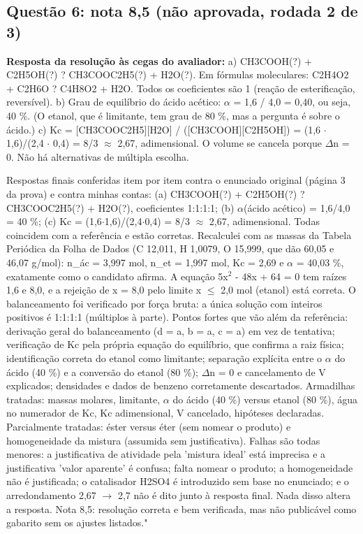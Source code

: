 \documentclass{article}%
\begin{document}
\subsection*{Questão 6: nota 8,5 (não aprovada, rodada 2 de 3)}%
\textbf{Resposta da resolução às cegas do avaliador:} a) CH3COOH(?) + C2H5OH(?) ? CH3COOC2H5(?) + H2O(?). Em fórmulas moleculares: C2H4O2 + C2H6O ? C4H8O2 + H2O. Todos os coeficientes são 1 (reação de esterificação, reversível).\newline%
\newline%
b) Grau de equilíbrio do ácido acético: $\alpha$ = 1,6 / 4,0 = 0,40, ou seja, 40 \%. (O etanol, que é limitante, tem grau de 80 \%, mas a pergunta é sobre o ácido.)\newline%
\newline%
c) Kc = {[}CH3COOC2H5{]}{[}H2O{]} / ({[}CH3COOH{]}{[}C2H5OH{]}) = (1,6 $\cdot$ 1,6)/(2,4 $\cdot$ 0,4) = 8/3 $\approx$ 2,67, adimensional. O volume se cancela porque $\Delta$n = 0.\newline%
\newline%
Não há alternativas de múltipla escolha.\par %
Respostas finais conferidas item por item contra o enunciado original (página 3 da prova) e contra minhas contas: (a) CH3COOH(?) + C2H5OH(?) ? CH3COOC2H5(?) + H2O(?), coeficientes 1:1:1:1; (b) $\alpha$(ácido acético) = 1,6/4,0 = 40 \%; (c) Kc = (1,6$\cdot$1,6)/(2,4$\cdot$0,4) = 8/3 $\approx$ 2,67, adimensional. Todas coincidem com a referência e estão corretas. Recalculei com as massas da Tabela Periódica da Folha de Dados (C 12,011, H 1,0079, O 15,999, que dão 60,05 e 46,07 g/mol): n\_ác = 3,997 mol, n\_et = 1,997 mol, Kc = 2,69 e $\alpha$ = 40,03 \%, exatamente como o candidato afirma. A equação 5x$^2$ - 48x + 64 = 0 tem raízes 1,6 e 8,0, e a rejeição de x = 8,0 pelo limite x $\leq$ 2,0 mol (etanol) está correta. O balanceamento foi verificado por força bruta: a única solução com inteiros positivos é 1:1:1:1 (múltiplos à parte). Pontos fortes que vão além da referência: derivação geral do balanceamento (d = a, b = a, c = a) em vez de tentativa; verificação de Kc pela própria equação do equilíbrio, que confirma a raiz física; identificação correta do etanol como limitante; separação explícita entre o $\alpha$ do ácido (40 \%) e a conversão do etanol (80 \%); $\Delta$n = 0 e cancelamento de V explicados; densidades e dados de benzeno corretamente descartados. Armadilhas tratadas: massas molares, limitante, $\alpha$ do ácido (40 \%) versus etanol (80 \%), água no numerador de Kc, Kc adimensional, V cancelado, hipóteses declaradas. Parcialmente tratadas: éster versus éter (sem nomear o produto) e homogeneidade da mistura (assumida sem justificativa). Falhas são todas menores: a justificativa de atividade pela 'mistura ideal' está imprecisa e a justificativa 'valor aparente' é confusa; falta nomear o produto; a homogeneidade não é justificada; o catalisador H2SO4 é introduzido sem base no enunciado; e o arredondamento 2,67 $\to$ 2,7 não é dito junto à resposta final. Nada disso altera a resposta. Nota 8,5: resolução correta e bem verificada, mas não publicável como gabarito sem os ajustes listados."%
\end{document}
